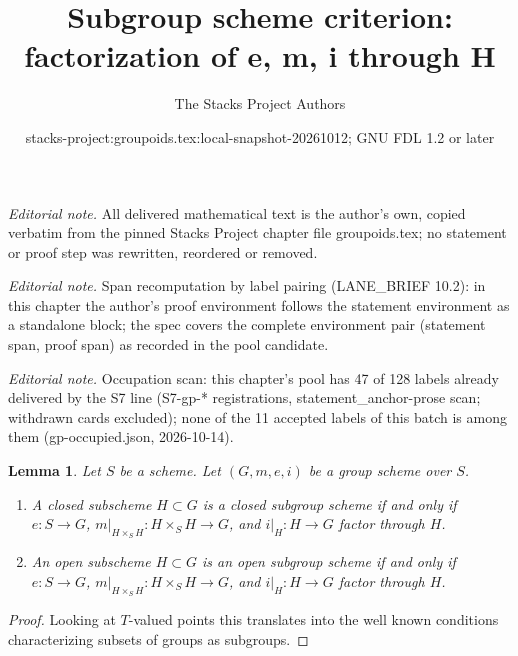 \documentclass[10pt,a4paper]{amsart}
\title{Subgroup scheme criterion: factorization of e, m, i through H}
\author{The Stacks Project Authors}
\date{stacks-project:groupoids.tex:local-snapshot-20261012; GNU FDL 1.2 or later}
\theoremstyle{plain}
\newtheorem{lemma}[subsection]{Lemma}
\theoremstyle{definition}
\theoremstyle{remark}
\numberwithin{equation}{subsection}
\begin{document}
\maketitle
\noindent\textit{Editorial note.} All delivered mathematical text is the author's own, copied verbatim from the pinned Stacks Project chapter file groupoids.tex; no statement or proof step was rewritten, reordered or removed.\par\medskip
\noindent\textit{Editorial note.} Span recomputation by label pairing (LANE\_BRIEF 10.2): in this chapter the author's proof environment follows the statement environment as a standalone block; the spec covers the complete environment pair (statement span, proof span) as recorded in the pool candidate.\par\medskip
\noindent\textit{Editorial note.} Occupation scan: this chapter's pool has 47 of 128 labels already delivered by the S7 line (S7-gp-* registrations, statement\_anchor-prose scan; withdrawn cards excluded); none of the 11 accepted labels of this batch is among them (gp-occupied.json, 2026-10-14).\par\medskip
\begin{lemma}
\label{lemma-closed-subgroup-scheme}
Let $S$ be a scheme. Let $(G, m, e, i)$ be a group scheme over $S$.
\begin{enumerate}
\item A closed subscheme $H \subset G$ is a closed subgroup scheme
if and only if $e : S \to G$, $m|_{H \times_S H} : H \times_S H \to G$,
and $i|_H : H \to G$ factor through $H$.
\item An open subscheme $H \subset G$ is an open subgroup scheme
if and only if $e : S \to G$, $m|_{H \times_S H} : H \times_S H \to G$,
and $i|_H : H \to G$ factor through $H$.
\end{enumerate}
\end{lemma}

\begin{proof}
Looking at $T$-valued points this translates into the well known
conditions characterizing subsets of groups as subgroups.
\end{proof}
\end{document}
